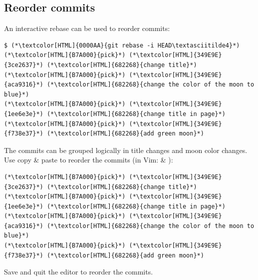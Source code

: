 \subsection{Reorder commits}
\begin{frame}[fragile]
  \subslidetitle
  An interactive rebase can be used to reorder commits:

  \begin{lstlisting}
$ (*\textcolor[HTML]{0000AA}{git rebase -i HEAD\textasciitilde4}*)
(*\textcolor[HTML]{B7A000}{pick}*) (*\textcolor[HTML]{349E9E}{3ce2637}*) (*\textcolor[HTML]{682268}{change title}*)
(*\textcolor[HTML]{B7A000}{pick}*) (*\textcolor[HTML]{349E9E}{aca9316}*) (*\textcolor[HTML]{682268}{change the color of the moon to blue}*)
(*\textcolor[HTML]{B7A000}{pick}*) (*\textcolor[HTML]{349E9E}{1ee6e3e}*) (*\textcolor[HTML]{682268}{change title in page}*)
(*\textcolor[HTML]{B7A000}{pick}*) (*\textcolor[HTML]{349E9E}{f738e37}*) (*\textcolor[HTML]{682268}{add green moon}*)
\end{lstlisting}

  The commits can be grouped logically in title changes and moon color changes.\\
  Use copy \& paste to reorder the commits (in Vim:  \& ):

  \begin{lstlisting}
(*\textcolor[HTML]{B7A000}{pick}*) (*\textcolor[HTML]{349E9E}{3ce2637}*) (*\textcolor[HTML]{682268}{change title}*)
(*\textcolor[HTML]{B7A000}{pick}*) (*\textcolor[HTML]{349E9E}{1ee6e3e}*) (*\textcolor[HTML]{682268}{change title in page}*)
(*\textcolor[HTML]{B7A000}{pick}*) (*\textcolor[HTML]{349E9E}{aca9316}*) (*\textcolor[HTML]{682268}{change the color of the moon to blue}*)
(*\textcolor[HTML]{B7A000}{pick}*) (*\textcolor[HTML]{349E9E}{f738e37}*) (*\textcolor[HTML]{682268}{add green moon}*)
\end{lstlisting}

  Save and quit the editor to reorder the commits.
\end{frame}


